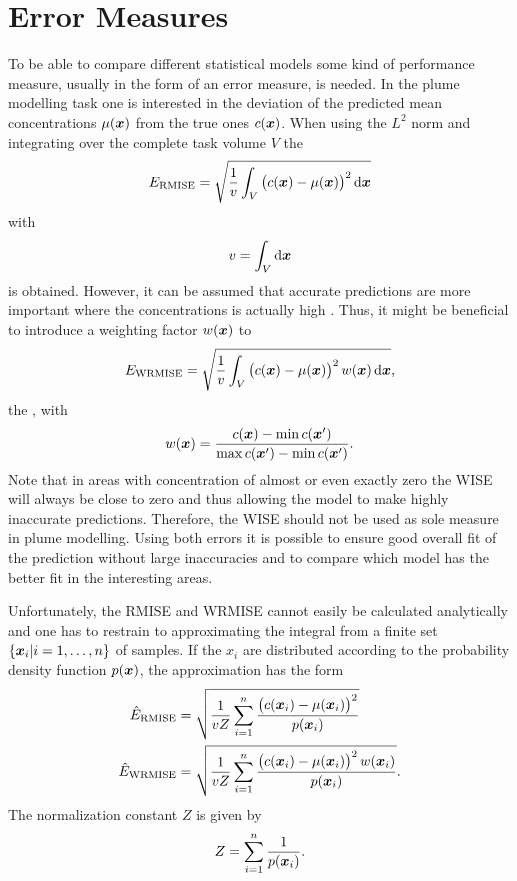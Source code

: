 \chapter{Error Measures}\label{sec:error}
To be able to compare different statistical models some kind of performance 
measure, usually in the form of an error measure, is needed. In the plume 
modelling task one is interested in the deviation of the predicted mean 
concentrations $\mu(\bm{x})$ from the true ones $c(\bm{x})$. When using the $L^2$ 
norm and integrating over the complete task volume $V$ the 
\begin{equation}
    E\ped{RMISE} = \sqrt{\frac{1}{v} \int_V \del{c(\vc x) - \mu(\vc x)}^2 
        \dif\vc x}
\end{equation}
with
\begin{equation}
    v = \int_V \dif\vc x
\end{equation}
is obtained. However, it can be assumed that accurate predictions are more 
important where the concentrations is actually high 
\parencite[c.p.][]{Marchant:2012wb}. Thus, it might be beneficial to introduce 
a weighting factor $w(\bm{x})$ to
\begin{equation}
    E\ped{WRMISE} = \sqrt{\frac{1}{v} \int_V \del{c(\vc x) - \mu(\vc x)}^2 w(\vc 
        x) \dif\vc x} \text{,}
\end{equation}
the , with
\begin{equation}
    w(\bm{x}) = \frac{c(\bm{x}) - \min c(\bm{x}')}{\max c(\bm{x}') - \min c(\bm{x}')} 
    \text{.}
\end{equation}
Note that in areas with concentration of almost or even exactly zero the WISE 
will always be close to zero and thus allowing the model to make highly 
inaccurate predictions. Therefore, the WISE should not be used as sole measure 
in plume modelling. Using both errors it is possible to ensure good overall fit 
of the prediction without large inaccuracies and to compare which model has the 
better fit in the interesting areas.

Unfortunately, the RMISE and WRMISE cannot easily be calculated analytically and 
one has to restrain to approximating the integral from a finite set $\{\bm{x}_i 
| i = 1, \dots, n\}$ of samples. If the $x_i$ are distributed according to the 
probability density function $p(\bm{x})$, the approximation has the form
\begin{align}
    \hat E\ped{RMISE} &= \sqrt{\frac{1}{vZ} \sum_{i=1}^n \frac{\del{c(\vc x_i) 
                - \mu(\vc x_i)}^2}{p(\vc x_i)}} \\
    \hat E\ped{WRMISE} &= \sqrt{\frac{1}{vZ} \sum_{i=1}^n \frac{\del{c(\vc x_i) 
                - \mu(\vc x_i)}^2 w(\vc x_i)}{p(\vc x_i)}} \text{.}
\end{align}
The normalization constant $Z$ is given by
\begin{equation}
    Z = \sum_{i=1}^n \frac{1}{p(\bm{x}_i)} \text{.}
\end{equation}

